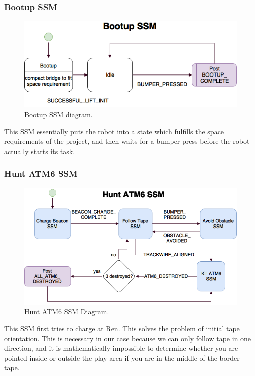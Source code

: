 \documentclass[]{article}
\begin{document}
\subsubsection{Bootup SSM}
\begin{figure}[H]
    \centering
    \includegraphics[scale=0.60]{bootup-ssm.png}
    \caption{Bootup SSM diagram.}
    \label{fig: bootup ssm}
\end{figure}
This SSM essentially puts the robot into a state which fulfills the space requirements of the project, and then waits for a bumper press before the robot actually starts its task.


\subsubsection{Hunt ATM6 SSM}
\begin{figure}[H]
    \centering
    \includegraphics[scale=0.60]{hunt-atm6-ssm.png}
    \caption{Hunt ATM6 SSM Diagram.}
    \label{fig: hunt atm6 ssm}
\end{figure}
This SSM first tries to charge at Ren. This solves the problem of initial tape orientation. This is necessary in our case because we can only follow tape in one direction, and it is mathematically impossible to determine whether you are pointed inside or outside the play area if you are in the middle of the border tape.
\end{document}
